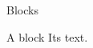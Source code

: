 \documentclass{beamer}
\begin{document}
\begin{frame}{Blocks}
\begin{block}{A block}
Its text.
\end{block}
\end{frame}
\end{document}
